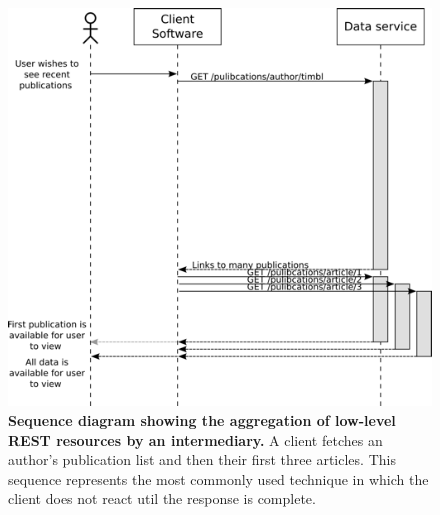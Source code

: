 \documentclass[12pt, ]{article}
\makeatletter
\def\maxwidth{\ifdim\Gin@nat@width>\linewidth\linewidth
\else\Gin@nat@width\fi}
\let\Oldincludegraphics\includegraphics
\renewcommand{\includegraphics}[1]{\Oldincludegraphics[width=\maxwidth]{#1}}
\makeatother
\begin{document}
\begin{figure}[htbp]
\centering
\includegraphics{images/rest_timeline_1.png}
\caption{\textbf{Sequence diagram showing the aggregation of low-level
REST resources by an intermediary.} A client fetches an author's
publication list and then their first three articles. This sequence
represents the most commonly used technique in which the client does not
react util the response is complete. \label{rest_timeline_1}}
\end{figure}
\end{document}
